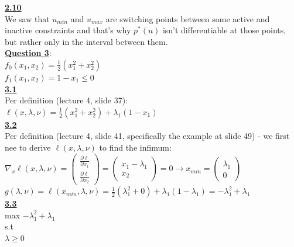 \documentclass[fleqn]{article}
\begin{document}
\underline{\textbf{2.10}} \\

We saw that $u_{min}$ and $u_{max}$ are switching points between some active and inactive constraints and that's why $p^*(u)$ isn't differentiable at those points, but rather only in the interval between them. \\

\clearpage\underline{\textbf{Question 3}}:\\

$f_0(x_1,x_2)  =\frac{1}{2}(x_1^2+x_2^2)$ \\

$f_1(x_1,x_2) = 1-x_1 \leq 0$ \\

\underline{\textbf{3.1}} \\
Per definition (lecture 4, slide 37): \\
$\ell(x, \lambda, \nu) = \frac{1}{2}(x_1^2+x_2^2) + \lambda_1(1-x_1)$ \\

\underline{\textbf{3.2}} \\
Per definition (lecture 4, slide 41, specifically the example at slide 49) - we first nee to derive $\ell(x, \lambda, \nu)$ to find the infimum: \\

$\nabla_x \ell(x, \lambda, \nu) =     \begin{pmatrix}
           \frac{\partial \ell}{\partial x_1} \\
            \frac{\partial \ell}{\partial x_2} 
         \end{pmatrix} = 
  \begin{pmatrix}
           x_1 - \lambda_1 \\
            x_2 
         \end{pmatrix} = 0 \rightarrow x_{min} = 
  \begin{pmatrix}
           \lambda_1 \\
            0 
         \end{pmatrix}$ \\

$g(\lambda, \nu) = \ell(x_{min}, \lambda, \nu) =  
\frac{1}{2}(\lambda_1^2+0) + \lambda_1(1-\lambda_1)=
-\lambda_1^2 + \lambda_1
$ \\

\underline{\textbf{3.3}} \\
max $-\lambda_1^2 + \lambda_1$\\s.t\\
$\lambda \geq0$ \\
\end{document}
